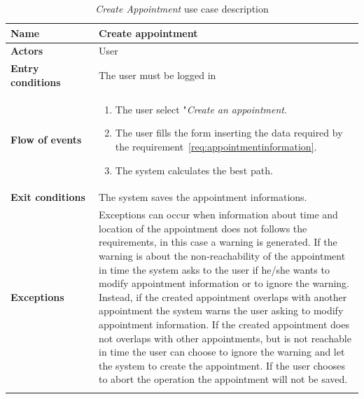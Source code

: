 \newpage
\begin{longtable}{p{0.25\linewidth}|p{0.75\linewidth}}
	\hline
	\label{tab:createappointment}
	\textbf{Name} & \textbf{Create appointment} \\
	\hline
	\textbf{Actors} & User \\
	\hline
	\textbf{Entry conditions} & The user must be logged in\\
	\hline
	\textbf{Flow of events} & 
	\begin{enumerate}
		\item The user select "\emph{Create an appointment}.
		\item The user fills the form inserting the data required by the requirement~\ref{req:appointmentinformation}.
		\item The system calculates the best path.
	\end{enumerate}\\
	\hline
	\textbf{Exit conditions} & The system saves the appointment informations.\\
	\hline
	\textbf{Exceptions} & Exceptions can occur when information about time and location of the appointment does not follows the requirements, in this case a warning is generated.
	If the warning is about the non-reachability of the appointment in time the system asks to the user if he/she wants to modify appointment information or to ignore the warning.
	Instead, if the created appointment overlaps with another appointment the system warns the user asking to modify appointment information.
	If the created appointment does not overlaps with other appointments, but is not reachable in time the user can choose to ignore the warning and let the system to create the appointment.
	If the user chooses to abort the operation the appointment will not be saved.
	 \\
	\hline
	\caption{\emph{Create Appointment} use case description}
\end{longtable}

